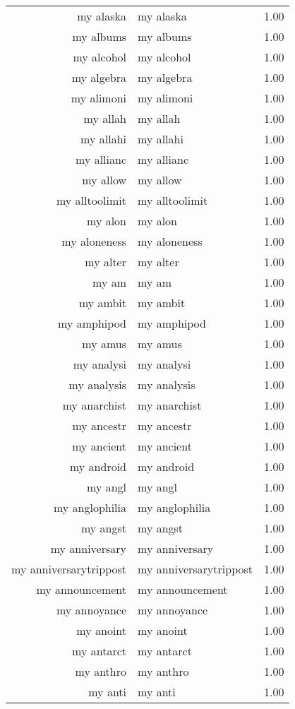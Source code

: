 \begin{table}[ht]
\begin{tabular}{rlr}
  my alaska & my alaska & 1.00 \\ 
  my albums & my albums & 1.00 \\ 
  my alcohol & my alcohol & 1.00 \\ 
  my algebra & my algebra & 1.00 \\ 
  my alimoni & my alimoni & 1.00 \\ 
  my allah & my allah & 1.00 \\ 
  my allahi & my allahi & 1.00 \\ 
  my allianc & my allianc & 1.00 \\ 
  my allow & my allow & 1.00 \\ 
  my alltoolimit & my alltoolimit & 1.00 \\ 
  my alon & my alon & 1.00 \\ 
  my aloneness & my aloneness & 1.00 \\ 
  my alter & my alter & 1.00 \\ 
  my am & my am & 1.00 \\ 
  my ambit & my ambit & 1.00 \\ 
  my amphipod & my amphipod & 1.00 \\ 
  my amus & my amus & 1.00 \\ 
  my analysi & my analysi & 1.00 \\ 
  my analysis & my analysis & 1.00 \\ 
  my anarchist & my anarchist & 1.00 \\ 
  my ancestr & my ancestr & 1.00 \\ 
  my ancient & my ancient & 1.00 \\ 
  my android & my android & 1.00 \\ 
  my angl & my angl & 1.00 \\ 
  my anglophilia & my anglophilia & 1.00 \\ 
  my angst & my angst & 1.00 \\ 
  my anniversary & my anniversary & 1.00 \\ 
  my anniversarytrippost & my anniversarytrippost & 1.00 \\ 
  my announcement & my announcement & 1.00 \\ 
  my annoyance & my annoyance & 1.00 \\ 
  my anoint & my anoint & 1.00 \\ 
  my antarct & my antarct & 1.00 \\ 
  my anthro & my anthro & 1.00 \\ 
  my anti & my anti & 1.00 \\ 

\end{tabular}
\end{table}
